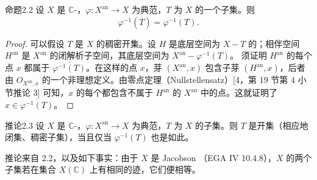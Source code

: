 \begin{SGAresult}{命题}{2.2}
设 $X$ 是 $\mathbb C$-，$\varphi:X^{\mathrm{an}}\to X$ 为典范，$T$ 为 $X$ 的一个子集。则
\[
\varphi^{-1}(\overline T)=\overline{\varphi^{-1}(T)}.
\]
\end{SGAresult}
\begin{proof}
可以假设 $T$ 是 $X$ 的稠密开集。设 $H$ 是底层空间为 $X-T$ 的；相伴空间 $H^{\mathrm{an}}$ 是 $X^{\mathrm{an}}$ 的闭解析子空间，其底层空间为 $X^{\mathrm{an}}-\varphi^{-1}(T)$。
须证明 $H^{\mathrm{an}}$ 的每个点 $x$ 都属于 $\overline{\varphi^{-1}(T)}$。在这样的点 $x$，芽 $(X^{\mathrm{an}},x)$ 包含子芽 $(H^{\mathrm{an}},x)$，后者由 $O_{X^{\mathrm{an}},x}$ 的一个非理想定义。由零点定理（Nullstellensatz）[4，第 19 节第 4 小节推论 3] 可知，$x$ 的每个都包含不属于 $H^{\mathrm{an}}$ 的 $X^{\mathrm{an}}$ 中的点。这就证明了 $x\in\overline{\varphi^{-1}(T)}$。
\end{proof}

\begin{SGAresult}{推论}{2.3}
设 $X$ 是 $\mathbb C$-，$\varphi:X^{\mathrm{an}}\to X$ 为典范，$T$ 为 $X$ 的子集。则 $T$ 是开集（相应地闭集、稠密子集），当且仅当 $\varphi^{-1}(T)$ 也是如此。
\end{SGAresult}
推论来自 2.2，以及如下事实：由于 $X$ 是 Jacobson （EGA IV 10.4.8），$X$ 的两个子集若在集合 $X(\mathbb C)$ 上有相同的迹，它们便相等。

